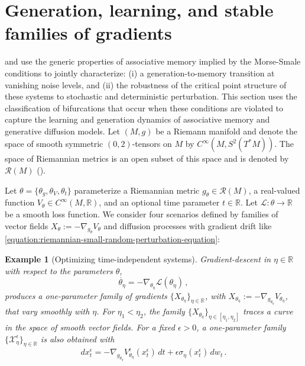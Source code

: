 \documentclass[12pt]{article}
\newtheorem{example}{Example}
\begin{document}
\section{Generation, learning, and stable families of gradients}
\label{section:generic-arcs}
 and  use the generic properties of associative memory implied by the Morse-Smale conditions to jointly characterize: (i) a generation-to-memory transition at vanishing noise levels, and (ii) the robustness of the critical point structure of these systems to stochastic and deterministic perturbation. This section uses the classification of bifurcations that occur when these conditions are violated to capture the learning and generation dynamics of associative memory and generative diffusion models. Let $(M,g)$ be a Riemann manifold and denote the space of smooth symmetric $(0,2)$-tensors on $M$ by $C^{\infty}(M,S^{2}(T^{*}M))$. The space of Riemannian metrics is an open subset of this space and is denoted by $\mathcal{R}(M)$ (\cite{tuschmann2015moduli}). 

Let $\theta = \{\theta_g, \theta_V, \theta_t\}$ parameterize a Riemannian metric $g_{\theta} \in \mathcal{R}(M)$, a real-valued function $V_{\theta} \in C^\infty(M,\mathbb{R})$, and an optional time parameter $t \in \mathbb{R}$. Let $\mathcal{L}: \theta \rightarrow \mathbb{R}$ be a smooth loss function. We consider four scenarios defined by families of vector fields $X_{\theta} := -\nabla_{g_{\theta}} V_{\theta}$ and diffusion processes with gradient drift like \eqref{equation:riemannian-small-random-perturbation-equation}:

\begin{example}[Optimizing time-independent systems]
\label{example:one-parameter-family-associative-memory-optimization}
    Gradient-descent in $\eta \in \mathbb{R}$ with respect to the parameters $\theta$,
    \begin{equation*}
        \dot{\theta_\eta} = -\nabla_{\theta_\eta} \mathcal{L}(\theta_\eta) \, ,
    \end{equation*}
    produces a one-parameter family of gradients $\{ X_{\theta_{\eta}} \}_{\eta\in \mathbb{R}}$, with $X_{\theta_{\eta}} := -\nabla_{g_{\theta_{\eta}}} V_{\theta_{\eta}}$, that vary smoothly with $\eta$. For $\eta_1 < \eta_2$, the family $\{ X_{\theta_{\eta}} \}_{\eta\in [\eta_1,\eta_2]}$ traces a curve in the space of smooth vector fields. For a fixed $\epsilon >0$, a one-parameter family $\{\mathcal{X}^{\epsilon}_{\eta}\}_{\eta \in \mathbb{R}}$ is also obtained with
    \begin{equation*}
        d{x_t^{\epsilon}} = -\nabla_{g_{\theta_{\eta}}}V^{\epsilon}_{{\theta_{\eta}}}(x_t^{\epsilon})\,dt + \epsilon\sigma_{\eta}(x_t^{\epsilon})\,dw_t \, .
    \end{equation*}
\end{example}  
\end{document}
